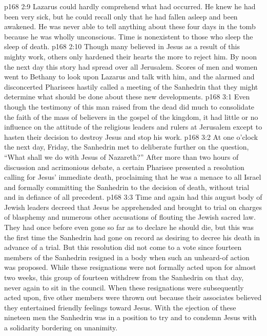 \vs p168 2:9 \pc Lazarus could hardly comprehend what had occurred. He knew he had been very sick, but he could recall only that he had fallen asleep and been awakened. He was never able to tell anything about these four days in the tomb because he was wholly unconscious. Time is nonexistent to those who sleep the sleep of death.
\vs p168 2:10 Though many believed in Jesus as a result of this mighty work, others only hardened their hearts the more to reject him. By noon the next day this story had spread over all Jerusalem. Scores of men and women went to Bethany to look upon Lazarus and talk with him, and the alarmed and disconcerted Pharisees hastily called a meeting of the Sanhedrin that they might determine what should be done about these new developments.
\vs p168 3:1 Even though the testimony of this man raised from the dead did much to consolidate the faith of the mass of believers in the gospel of the kingdom, it had little or no influence on the attitude of the religious leaders and rulers at Jerusalem except to hasten their decision to destroy Jesus and stop his work.
\vs p168 3:2 \pc At one o’clock the next day, Friday, the Sanhedrin met to deliberate further on the question, “What shall we do with Jesus of Nazareth?” After more than two hours of discussion and acrimonious debate, a certain Pharisee presented a resolution calling for Jesus’ immediate death, proclaiming that he was a menace to all Israel and formally committing the Sanhedrin to the decision of death, without trial and in defiance of all precedent.
\vs p168 3:3 Time and again had this august body of Jewish leaders decreed that Jesus be apprehended and brought to trial on charges of blasphemy and numerous other accusations of flouting the Jewish sacred law. They had once before even gone so far as to declare he should die, but this was the first time the Sanhedrin had gone on record as desiring to decree his death in advance of a trial. But this resolution did not come to a vote since fourteen members of the Sanhedrin resigned in a body when such an unheard\hyp{}of action was proposed. While these resignations were not formally acted upon for almost two weeks, this group of fourteen withdrew from the Sanhedrin on that day, never again to sit in the council. When these resignations were subsequently acted upon, five other members were thrown out because their associates believed they entertained friendly feelings toward Jesus. With the ejection of these nineteen men the Sanhedrin was in a position to try and to condemn Jesus with a solidarity bordering on unanimity.
